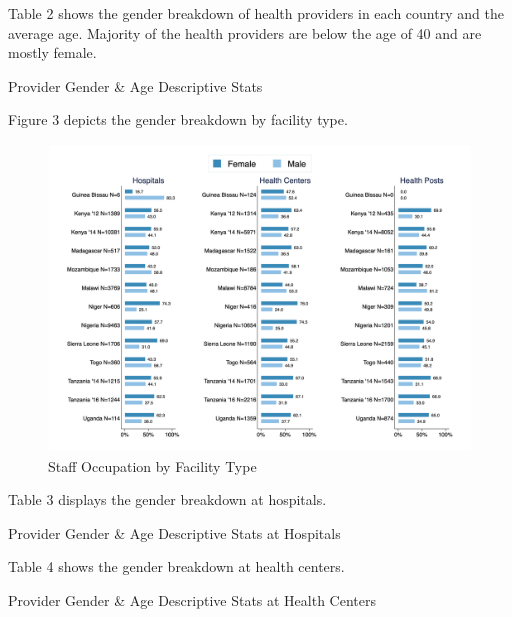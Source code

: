 \documentclass{article}                 %
\begin{document}
	Table 2 shows the gender breakdown of health providers in each country and the average age. Majority of the health providers are below the age of 40 and are mostly female. 
	
			\begin{table}[H]
				\centering
				\caption{Provider Gender \& Age Descriptive Stats}
				
			\end{table}
		
 	Figure 3 depicts the gender breakdown by facility type. 	
		
			\begin{figure}[H] 
				\centering
				\caption{Staff Occupation  by Facility Type} 
				\includegraphics[width=\textwidth]{"../Output/Final/Gender_fl"}
			\end{figure}
		
	Table 3 displays the gender breakdown at hospitals. 	
		
			\begin{table}[H]
				\centering
				\caption{Provider Gender \& Age Descriptive Stats at Hospitals}
				
			\end{table}
		
	Table 4 shows the gender breakdown at health centers. 
		
			\begin{table}[H]
				\centering
				\caption{Provider Gender \& Age Descriptive Stats at Health Centers}
				
			\end{table}
		
\end{document}

